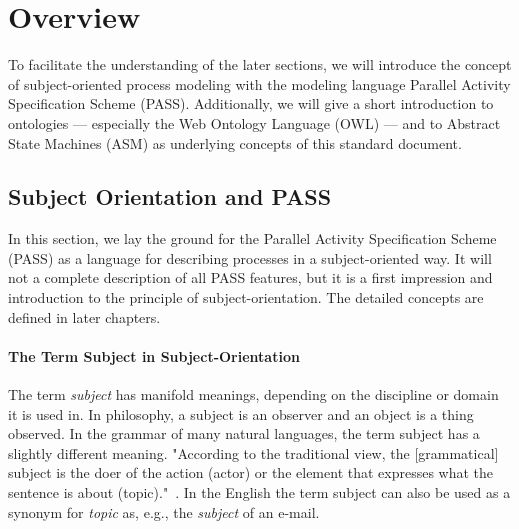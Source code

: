 
\chapter{Overview}


To facilitate the understanding of the later sections, we will introduce the concept of subject-oriented process modeling with the modeling language Parallel Activity Specification Scheme (PASS). Additionally, we will give a short introduction to ontologies --- especially the Web Ontology Language (OWL) --- and to Abstract State Machines (ASM) as underlying concepts of this standard document.

\section{Subject Orientation and PASS}
\label{SubjectOrient} 



In this section, we lay the ground for the Parallel Activity Specification Scheme (PASS) as a language for describing processes in a subject-oriented way. It will not a complete description of all PASS features, but it is a first impression and introduction to the principle of subject-orientation. The detailed concepts are defined in later chapters.

\subsubsection{The Term Subject in Subject-Orientation}

The term \textit{subject} has manifold meanings, depending on the discipline or domain it is used in. In philosophy, a subject is an observer and an object is a thing observed. In the grammar of many natural languages, the term subject has a slightly different meaning. "According to the traditional view, the [grammatical] subject is the doer of the action (actor) or the element that expresses what the sentence is about (topic)."~\cite{article:GeneralSubject}. In the English the term subject can also be used as a synonym for \textit{topic} as, e.g., the \textit{subject} of an e-mail. 

